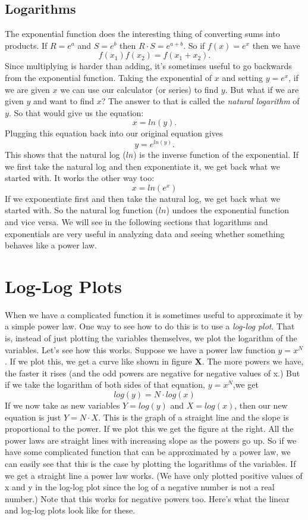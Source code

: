 \subsection*{Logarithms}
The exponential function does the interesting thing of converting sums into products.
If $R = e^{a}$ and $S = e^{b}$ then $R \cdot S = e^{a+b}$.
So if $f(x) = e^{x}$ then we have
\[ f(x_{1})f(x_{2}) = f(x_{1} + x_{2}). \]
Since multiplying is harder than adding, it's sometimes useful to go backwards from the exponential function. 
Taking the exponential of $x$ and setting $y = e^{x}$, if we are given $x$ we can use our calculator (or series) to find $y$.
But what if we are given $y$ and want to find $x$?
The answer to that is called the \emph{natural logarithm} of $y$.
So that would give us the equation:
\[ x = ln(y). \]
Plugging this equation back into our original equation gives
\[ y = e^{ln(y)}. \]
This shows that the natural log ($ln$) is the inverse function of the exponential.
If we first take the natural log and then exponentiate it, we get back what we started with.
It works the other way too:
\[ x = ln(e^{x}) \]
If we exponentiate first and then take the natural log, we get back what we started with.
So the natural log function ($ln$) undoes the exponential function and vice versa.
We will see in the following sections that logarithms and exponentials are very useful in analyzing data and seeing whether something behaves like a power law. 

\section{Log-Log Plots}
When we have a complicated function it is sometimes useful to approximate it by a simple power law.
One way to see how to do this is to use a \emph{log-log plot}.
That is, instead of just plotting the variables themselves, we plot the logarithm of the variables.
Let's see how this works.
Suppose we have a power law function $y = x^{N}$.
If we plot this, we get a curve like shown in figure \textbf{X}.
The more powers we have, the faster it rises (and the odd powers are negative for negative values of x.)
But if we take the logarithm of both sides of that equation, $y = x^{N}$,we get
\[ log(y)=N \cdot log(x) \] 
If we now take as new variables $Y = log(y)$ and $X = log(x)$, then our new equation is just $Y = N \cdot X$.
This is the graph of a straight line and the slope is proportional to the power.
If we plot this we get the figure at the right.
All the power laws are straight lines with increasing slope as the powers go up.
So if we have some complicated function that can be approximated by a power law, we can easily see that this is the case by plotting the logarithms of the variables. 
If we get a straight line a power law works. 
(We have only plotted positive values of x and y in the log-log plot since the log of a negative number is not a real number.)
Note that this works for negative powers too. 
Here's what the linear and log-log plots look like for these.

